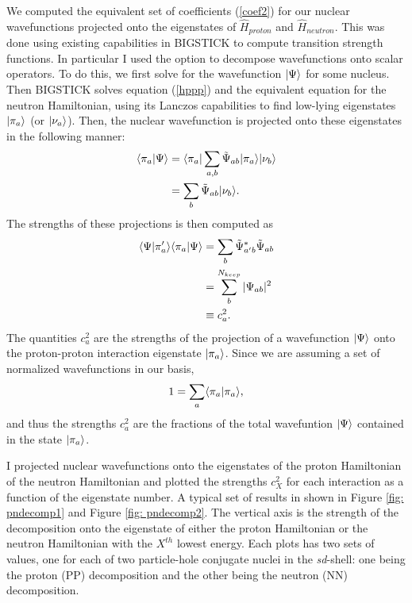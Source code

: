 We computed the equivalent set of coefficients (\ref{coef2}) for our
nuclear wavefunctions projected onto the eigenstates of $\hat{H}_{proton}$ and
$\hat{H}_{neutron}$.
This was done using existing
capabilities in BIGSTICK to compute transition strength functions. In particular I
used the option to decompose wavefunctions onto scalar operators\cite{Johnson18}.
To do this, we first solve for the wavefunction $|\Psi\rangle$ for some nucleus.
Then BIGSTICK solves equation (\ref{hppp}) and the equivalent equation for the
neutron Hamiltonian, using its Lanczos capabilities to find low-lying 
eigenstates $|\pi_a\rangle$ (or $|\nu_a\rangle$). Then, the nuclear wavefunction is projected
onto these eigenstates in the following manner:
\begin{equation}\begin{split}
	\langle \pi_a|\Psi\rangle &= \langle \pi_a|\sum_{a,b}\tilde{\Psi}_{ab}|\pi_a\rangle|\nu_b\rangle \\
		              &= \sum_{b}\tilde{\Psi}_{ab}|\nu_b\rangle.
\end{split}\end{equation}
The strengths of these projections is then computed as
\begin{equation}\begin{split}
        \langle \Psi|\pi_a'\rangle\langle \pi_a|\Psi\rangle &= \sum_b \tilde{\Psi}^*_{a'b}\tilde{\Psi}_{ab} \\
 		&= \sum_b^{N_{keep}} |\Psi_{ab}|^2\\
        & \equiv c_a^2.
\end{split}\end{equation}
The quantities $c_a^2$ are the strengths of the projection of a wavefunction $|\Psi\rangle$
onto the proton-proton interaction eigenstate $|\pi_a\rangle$. Since we are assuming a set of normalized 
wavefunctions in our basis, 
\begin{equation}
1 = \sum_a \langle \pi_a|\pi_a\rangle,
\end{equation}
and thus the strengths $c_a^2$ are the fractions of the total wavefuntion $|\Psi\rangle$
contained in the state $|\pi_a\rangle$.

I projected nuclear wavefunctions onto the eigenstates of the proton Hamiltonian
of the neutron Hamiltonian and plotted the strengths $c_X^2$ for each interaction
as a function of the eigenstate number. A typical set of results in shown in
Figure \ref{fig: pndecomp1} and Figure \ref{fig: pndecomp2}.
The vertical axis is the strength of the decomposition onto the eigenstate
of either the proton Hamiltonian or the
neutron Hamiltonian with the $X^{th}$ lowest energy. Each plots has two sets
of values, one for each of two particle-hole conjugate nuclei in the \textit{sd}-shell:
one being the proton (PP) decomposition and the other being the neutron (NN) decomposition.

